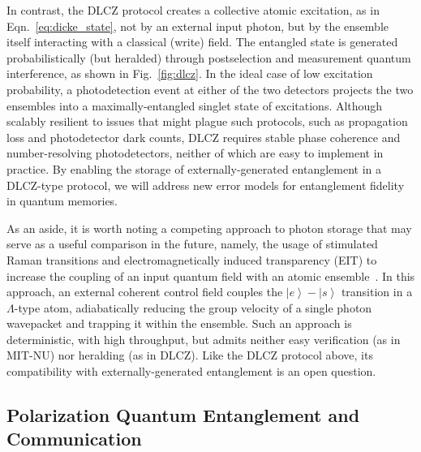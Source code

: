 \documentclass[aps,twocolumn,secnumarabic,amsmath,amssymb,pra,groupedaddress,
showpacs, showkeys]{revtex4-1}
\newcommand{\ket}[1]{\left|#1\right\rangle}
\begin{document}
In contrast, the DLCZ protocol creates a collective atomic excitation, as in
Eqn.~\ref{eq:dicke_state}, not by an external input photon, but by the ensemble
itself interacting with a classical (write) field. The entangled state is
generated probabilistically (but heralded) through postselection and
measurement quantum interference, as shown in Fig.~\ref{fig:dlcz}. In the ideal
case of low excitation probability, a photodetection event at either of the two
detectors projects the two ensembles into a maximally-entangled singlet state
of excitations. Although scalably resilient to issues that might plague such
protocols, such as propagation loss and photodetector dark counts, DLCZ
requires stable phase coherence and number-resolving photodetectors, neither of
which are easy to implement in practice. By enabling the storage of
externally-generated entanglement in a DLCZ-type protocol, we will address new
error models for entanglement fidelity in quantum memories.

As an aside, it is worth noting a competing approach to photon storage that may
serve as a useful comparison in the future, namely, the usage of stimulated
Raman transitions and electromagnetically induced transparency (EIT) to
increase the coupling of an input quantum field with an atomic
ensemble~\cite{PhysRevA.65.022314,RevModPhys.75.457,PhysRevLett.98.123601,PhysRevA.76.033804}. In
this approach, an external coherent control field couples the $\ket{e}-\ket{s}$
transition in a $\Lambda$-type atom, adiabatically reducing the group velocity
of a single photon wavepacket and trapping it within the ensemble. Such an
approach is deterministic, with high throughput, but admits neither easy
verification (as in MIT-NU) nor heralding (as in DLCZ). Like the DLCZ protocol
above, its compatibility with externally-generated entanglement is an open
question.

\subsection{Polarization Quantum Entanglement and Communication\label{sec:intro:entanglement}}
\end{document}
